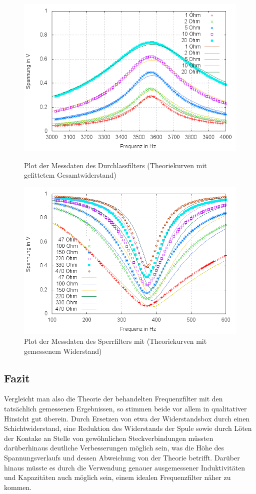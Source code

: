 \begin{figure}
	\includegraphics[width=.9\textwidth]{images/plot/durchlassfilter+theorie+R_ges-fit.png}
\caption{Plot der Messdaten des Durchlassfilters (Theoriekurven mit gefittetem Gesamtwiderstand)}
\label{plot:durchlass+R_ges-fit}

        \includegraphics[width=.9\textwidth]{images/plot/Sperrfilter-mit-Theoriekurven-mit-R_L.png}
\caption{Plot der Messdaten des Sperrfilters mit (Theoriekurven mit gemessenem Widerstand)}
\label{plot:sperr}
\end{figure}

\subsection{Fazit}
Vergleicht man also die Theorie der behandelten Frequenzfilter mit den tatsächlich gemessenen Ergebnissen, so stimmen beide vor allem in qualitativer Hinsicht gut überein. Durch Ersetzen von etwa der Widerstandsbox durch einen Schichtwiderstand, eine Reduktion des Widerstands der Spule sowie durch Löten der Kontake an Stelle von gewöhnlichen Steckverbindungen müssten darüberhinaus deutliche Verbesserungen möglich sein, was die Höhe des Spannungsverlaufs und dessen Abweichung von der Theorie betrifft. 
Darüber hinaus müsste es durch die Verwendung genauer ausgemessener Induktivitäten und Kapazitäten auch möglich sein, einem idealen Frequenzfilter näher zu kommen. 
